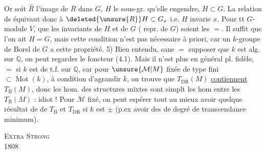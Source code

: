 Or soit $\widehat R$ l'image de $\overline R$ dans $G$, $H$ le sous-gr. qu'elle engendre, $H\subset G$.  La relation ds équivaut donc à $\deleted{\unsure{R}}H\subset G_x$ i.e. $H$ invarie $x$.
Pour tt $G$-module $V$, 
 que les invariants de $H$ et de $G$ (  repr. de $G$) soient les $=$. Il suffit que l'on ait $H=G$, mais cette condition n'est pas nécessaire à priori, car un $k$-groupe de Borel de $G$ a cette propriété.
5) Bien entendu, sans $=$ supposer que $k$ est alg. sur $\mathbb Q$, on peut regarder le foncteur (4.1). Mais il n'est plus en général pl. fidèle, $=$ si $k$ est de t.f. sur $\mathbb Q$, car pour $\unsure{\mathcal M|M}$  fixée de type fini $\subset\operatorname{Mot}(k)$, à condition d'agrandir $k$, on trouve que  $T_{\mathrm{DR}}(M)$ \uline{contiennent} $T_{\mathrm B}(M)$, donc les hom. des structures mixtes sont simplt les hom entre les $T_{\mathrm B}(M)$ : idiot !
Pour $\mathcal M$ fixé, on peut espérer tout au mieux avoir quelque résultat de  de $T_{\mathrm B}$ et $T_{\mathrm{DR}}$ si $k$ est $\pm$  (p.ex avoir des  de degré de transcendance minimum).
\par\noindent\textsc{Extra Strong}\\
 1808

